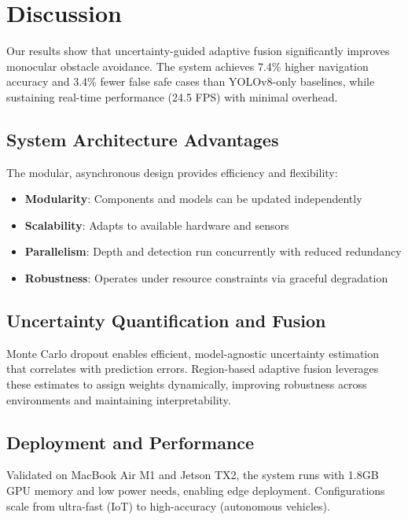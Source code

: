 \documentclass[12pt,oneside]{book}
\begin{document}
\section{Discussion}

Our results show that uncertainty-guided adaptive fusion significantly improves monocular obstacle avoidance. The system achieves 7.4\% higher navigation accuracy and 3.4\% fewer false safe cases than YOLOv8-only baselines, while sustaining real-time performance (24.5 FPS) with minimal overhead.

\subsection{System Architecture Advantages}

The modular, asynchronous design provides efficiency and flexibility:

\begin{itemize}
\item \textbf{Modularity}: Components and models can be updated independently
\item \textbf{Scalability}: Adapts to available hardware and sensors
\item \textbf{Parallelism}: Depth and detection run concurrently with reduced redundancy
\item \textbf{Robustness}: Operates under resource constraints via graceful degradation
\end{itemize}

\subsection{Uncertainty Quantification and Fusion}

Monte Carlo dropout enables efficient, model-agnostic uncertainty estimation that correlates with prediction errors. Region-based adaptive fusion leverages these estimates to assign weights dynamically, improving robustness across environments and maintaining interpretability.

\subsection{Deployment and Performance}

Validated on MacBook Air M1 and Jetson TX2, the system runs with 1.8GB GPU memory and low power needs, enabling edge deployment. Configurations scale from ultra-fast (IoT) to high-accuracy (autonomous vehicles).
\end{document}
